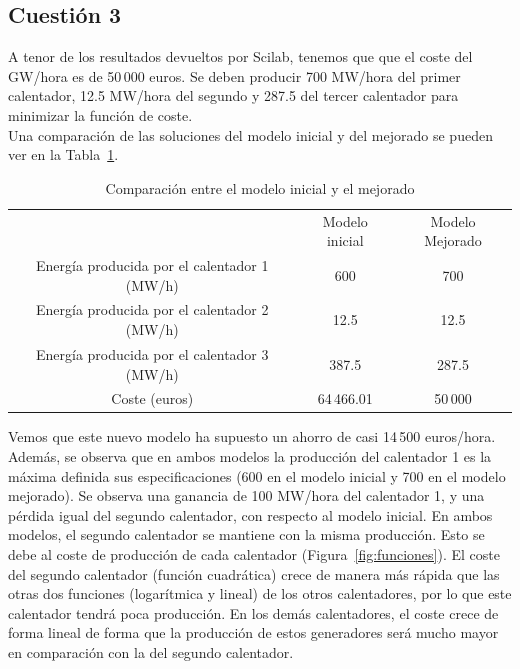 \documentclass[12pt,a4paper,twoside,openright,titlepage,final]{article}
\begin{document}
\subsection{Cuestión 3}

A tenor de los resultados devueltos por Scilab, tenemos que que el coste del GW/hora es de 50\,000 euros. Se deben producir 700 MW/hora del primer calentador, 12.5 MW/hora del segundo y 287.5 del tercer calentador para minimizar la función de coste.\\

Una comparación de las soluciones del modelo inicial y del mejorado se pueden ver en la Tabla~\ref{tbl:comparacion}.\\

\begin{table}[htbp!]
\centering
\caption{Comparación entre el modelo inicial y el mejorado}
\label{tbl:comparacion}
\begin{tabular}{@{}ccc@{}}
\cmidrule(l){2-3}
                                             & Modelo inicial & Modelo Mejorado \\ \cmidrule(l){2-3} 
Energía producida por el calentador 1 (MW/h) & 600            & 700             \\
Energía producida por el calentador 2 (MW/h) & 12.5           & 12.5            \\
Energía producida por el calentador 3 (MW/h) & 387.5          & 287.5           \\
Coste (euros)                                & 64\,466.01     & 50\,000         \\ \bottomrule
\end{tabular}
\end{table}

Vemos que este nuevo modelo ha supuesto un ahorro de casi 14\,500 euros/hora. Además, se observa que en ambos modelos la producción del calentador 1 es la máxima definida sus especificaciones (600 en el modelo inicial y 700 en el modelo mejorado). Se observa una ganancia de 100 MW/hora del calentador 1, y una pérdida igual del segundo calentador, con respecto al modelo inicial. En ambos modelos, el segundo calentador se mantiene con la misma producción. Esto se debe al coste de producción de cada calentador (Figura~\ref{fig:funciones}). El coste del segundo calentador (función cuadrática) crece de manera más rápida que las otras dos funciones (logarítmica y lineal) de los otros calentadores, por lo que este calentador tendrá poca producción. En los demás calentadores, el coste crece de forma lineal de forma que la producción de estos generadores será mucho mayor en comparación con la del segundo calentador.  
\end{document}
